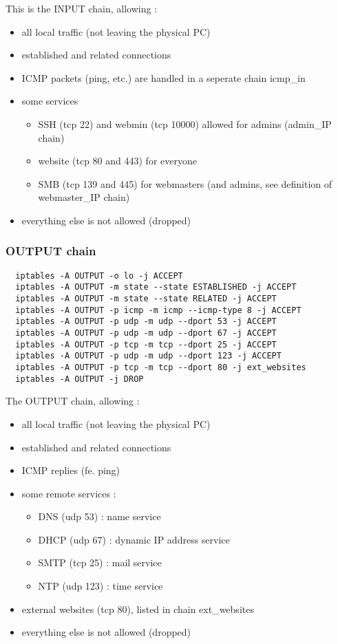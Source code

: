 \documentclass[a4paper,12pt]{article}
\begin{document}
This is the INPUT chain, allowing :
\begin{itemize}
  \item all local traffic (not leaving the physical PC)
  \item established and related connections
  \item ICMP packets (ping, etc.) are handled in a seperate chain icmp\_in
  \item some services
  \begin{itemize}
    \item SSH (tcp 22) and webmin (tcp 10000) allowed for admins (admin\_IP chain)
    \item website (tcp 80 and 443) for everyone
    \item SMB (tcp 139 and 445) for webmasters (and admins, see definition of webmaster\_IP chain)
  \end{itemize}
  \item everything else is not allowed (dropped)
\end{itemize}

\subsubsection{OUTPUT chain}

\begin{verbatim}
  iptables -A OUTPUT -o lo -j ACCEPT
  iptables -A OUTPUT -m state --state ESTABLISHED -j ACCEPT
  iptables -A OUTPUT -m state --state RELATED -j ACCEPT
  iptables -A OUTPUT -p icmp -m icmp --icmp-type 8 -j ACCEPT
  iptables -A OUTPUT -p udp -m udp --dport 53 -j ACCEPT
  iptables -A OUTPUT -p udp -m udp --dport 67 -j ACCEPT
  iptables -A OUTPUT -p tcp -m tcp --dport 25 -j ACCEPT
  iptables -A OUTPUT -p udp -m udp --dport 123 -j ACCEPT
  iptables -A OUTPUT -p tcp -m tcp --dport 80 -j ext_websites
  iptables -A OUTPUT -j DROP
\end{verbatim}

The OUTPUT chain, allowing :
\begin{itemize}
  \item all local traffic (not leaving the physical PC)
  \item established and related connections
  \item ICMP replies (fe. ping)
  \item some remote services :
  \begin{itemize}
    \item DNS (udp 53) : name service
    \item DHCP (udp 67) : dynamic IP address service
    \item SMTP (tcp 25) : mail service
    \item NTP (udp 123) : time service
  \end{itemize}
  \item external websites (tcp 80), listed in chain ext\_websites
  \item everything else is not allowed (dropped)
\end{itemize}
\end{document}
